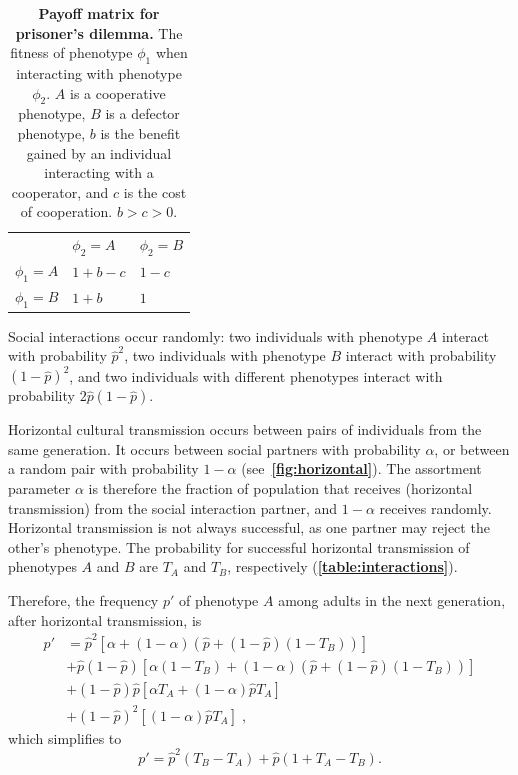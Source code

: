 \documentclass[12pt]{extarticle}
\begin{document}
\begin{table}[h]
\centering
\begin{tabular}{lll}
\toprule
           & $\phi_2=A$ & $\phi_2=B$ \\ \cmidrule(r){1-3}
$\phi_1=A$ & $1+b-c$ & $1-c$ \\
$\phi_1=B$ & $1+b$   & $1$
\\ \bottomrule
\end{tabular}
\caption{\textbf{Payoff matrix for prisoner's dilemma.}
The fitness of phenotype $\phi_1$ when interacting with phenotype $\phi_2$. $A$ is a cooperative phenotype, $B$ is a defector phenotype, $b$ is the benefit gained by an individual interacting with a cooperator, and $c$ is the cost of cooperation. $b>c>0$.
}
\label{table:prisoner_payoff}
\end{table}

Social interactions occur randomly:
two individuals with phenotype $A$ interact with probability $\hat{p}^2$, two individuals with phenotype $B$ interact with probability $(1-\hat{p})^2$, and two individuals with different phenotypes interact with probability $2\hat{p}(1-\hat{p})$. 

Horizontal cultural transmission occurs between pairs of individuals from the same generation. 
It occurs between social partners with probability $\alpha$, or between a random pair with probability $1-\alpha$ (see~\textbf{\autoref{fig:horizontal}}).
The assortment parameter $\alpha$ is therefore the fraction of population that receives (horizontal transmission) from the social interaction partner, and $1-\alpha$ receives randomly.
Horizontal transmission is not always successful, as one partner may reject the other's phenotype. The probability for successful horizontal transmission of phenotypes $A$ and $B$ are $T_A$ and $T_B$, respectively (\textbf{\autoref{table:interactions}}).

Therefore, the frequency $p'$ of phenotype $A$ among adults in the next generation, after horizontal transmission, is 
\begin{equation}\label{eq:nextgen_adults}
\begin{aligned}
p'
& = \hat{p}^2 [\alpha + (1-\alpha)(\hat{p} + (1-\hat{p})(1-T_B))] \\
& + \hat{p}(1-\hat{p}) [\alpha(1-T_B) + (1-\alpha)(\hat{p} + (1-\hat{p})(1-T_B))] \\
& + (1-\hat{p})\hat{p} [\alpha T_A + (1-\alpha) \hat{p} T_A ] \\
& + (1-\hat{p})^2 [(1-\alpha) \hat{p} T_A] \;,
\end{aligned}
\end{equation}
which simplifies to
\begin{equation}\label{eq:nextgen_adults_slimpify}
p' = \hat{p}^2(T_B-T_A) + \hat{p}(1+T_A-T_B) .
\end{equation}
\end{document}
